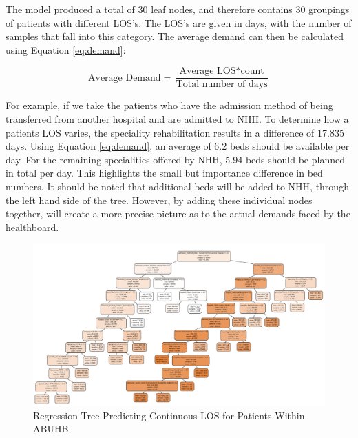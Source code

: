 \documentclass[../thesis.tex]{subfiles}
\begin{document}
The model produced a total of 30 leaf nodes, and therefore contains 30 groupings of patients with different LOS's. The LOS's are given in days, with the number of samples that fall into this category. The average demand can then be calculated using Equation \eqref{eq:demand}:

\begin{equation}\label{eq:demand}
    \text{Average Demand} = \frac{\text{Average LOS} * \text{count}}{\text{Total number of days}}
\end{equation}

For example, if we take the patients who have the admission method of being transferred from another hospital and are admitted to NHH. To determine how a patients LOS varies, the speciality rehabilitation results in a difference of 17.835 days. Using Equation \eqref{eq:demand}, an average of 6.2 beds should be available per day. For the remaining specialities offered by NHH, 5.94 beds should be planned in total per day. This highlights the small but importance difference in bed numbers. It should be noted that additional beds will be added to NHH, through the left hand side of the tree. However, by adding these individual nodes together, will create a more precise picture as to the actual demands faced by the healthboard.





\begin{landscape}
    \begin{figure}[h!]
        \centering
    \includegraphics[scale=0.72]{Chapters/Chapter5/Figures/regressiontreevisual.png}
        \caption{Regression Tree Predicting Continuous LOS for Patients Within ABUHB}
        \label{fig:finalregtree}
    \end{figure}
\end{landscape}
\end{document}
